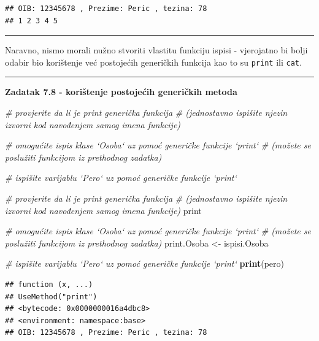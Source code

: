 \documentclass[]{book}
\newenvironment{Shaded}{\begin{snugshade}}{\end{snugshade}}
\newcommand{\KeywordTok}[1]{\textcolor[rgb]{0.13,0.29,0.53}{\textbf{#1}}}
\newcommand{\StringTok}[1]{\textcolor[rgb]{0.31,0.60,0.02}{#1}}
\newcommand{\CommentTok}[1]{\textcolor[rgb]{0.56,0.35,0.01}{\textit{#1}}}
\newcommand{\NormalTok}[1]{#1}
\theoremstyle{definition}
\theoremstyle{definition}
\theoremstyle{definition}
\theoremstyle{remark}
\begin{document}
\begin{verbatim}
## OIB: 12345678 , Prezime: Peric , tezina: 78 
## 1 2 3 4 5
\end{verbatim}

\begin{center}\rule{0.5\linewidth}{\linethickness}\end{center}

Naravno, nismo morali nužno stvoriti vlastitu funkciju ispisi -
vjerojatno bi bolji odabir bio korištenje već postojećih generičkih
funkcija kao to su \texttt{print} ili \texttt{cat}.

\begin{center}\rule{0.5\linewidth}{\linethickness}\end{center}

\textbf{Zadatak 7.8 - korištenje postojećih generičkih metoda}

\begin{Shaded}
\begin{Highlighting}[]
\CommentTok{# provjerite da li je print generička funkcija }
\CommentTok{# (jednostavno ispišite njezin izvorni kod navođenjem samog imena funkcije)}

\CommentTok{# omogućite ispis klase `Osoba` uz pomoć generičke funkcije `print`}
\CommentTok{# (možete se poslužiti funkcijom iz prethodnog zadatka)}

\CommentTok{# ispišite varijablu `Pero` uz pomoć generičke funkcije `print`}
\end{Highlighting}
\end{Shaded}

\begin{Shaded}
\begin{Highlighting}[]
\CommentTok{# provjerite da li je print generička funkcija }
\CommentTok{# (jednostavno ispišite njezin izvorni kod navođenjem samog imena funkcije)}
\NormalTok{print}

\CommentTok{# omogućite ispis klase `Osoba` uz pomoć generičke funkcije `print`}
\CommentTok{# (možete se poslužiti funkcijom iz prethodnog zadatka)}
\NormalTok{print.Osoba <-}\StringTok{ }\NormalTok{ispisi.Osoba}


\CommentTok{# ispišite varijablu `Pero` uz pomoć generičke funkcije `print`}
\KeywordTok{print}\NormalTok{(pero)}
\end{Highlighting}
\end{Shaded}

\begin{verbatim}
## function (x, ...) 
## UseMethod("print")
## <bytecode: 0x0000000016a4dbc8>
## <environment: namespace:base>
## OIB: 12345678 , Prezime: Peric , tezina: 78
\end{verbatim}
\end{document}

